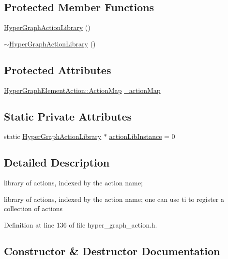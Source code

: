 \subsection*{Protected Member Functions}
\begin{DoxyCompactItemize}
\item 
\hyperlink{classg2o_1_1HyperGraphActionLibrary_a68fe0eee5bdda62e6929c3ee2b4b38f1}{Hyper\+Graph\+Action\+Library} ()
\item 
\hyperlink{classg2o_1_1HyperGraphActionLibrary_af0d04ecf012d498c09d68725aaf939e5}{$\sim$\+Hyper\+Graph\+Action\+Library} ()
\end{DoxyCompactItemize}
\subsection*{Protected Attributes}
\begin{DoxyCompactItemize}
\item 
\hyperlink{classg2o_1_1HyperGraphElementAction_abc889fc90ae1bbb63d90c7993777417a}{Hyper\+Graph\+Element\+Action\+::\+Action\+Map} \hyperlink{classg2o_1_1HyperGraphActionLibrary_afc9e9b39a743700dcfc896b50d176b3b}{\+\_\+action\+Map}
\end{DoxyCompactItemize}
\subsection*{Static Private Attributes}
\begin{DoxyCompactItemize}
\item 
static \hyperlink{classg2o_1_1HyperGraphActionLibrary}{Hyper\+Graph\+Action\+Library} $\ast$ \hyperlink{classg2o_1_1HyperGraphActionLibrary_a65d1811736d86ff9f6453a728cac160f}{action\+Lib\+Instance} = 0
\end{DoxyCompactItemize}


\subsection{Detailed Description}
library of actions, indexed by the action name; 

library of actions, indexed by the action name; one can use ti to register a collection of actions 

Definition at line 136 of file hyper\+\_\+graph\+\_\+action.\+h.



\subsection{Constructor \& Destructor Documentation}
